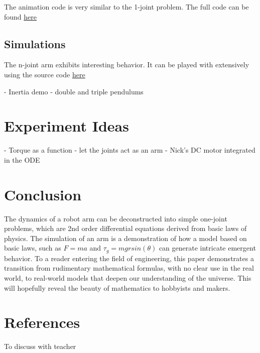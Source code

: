 \documentclass{article}
\begin{document}
\vspace{24pt}

The animation code is very similar to the 1-joint problem. The full code can be found \textcolor{blue}{\href{https://github.com/natebechard/Robotic-Arm-Simulation-From-First-Principles/blob/main/n_joints_constant_torque.py}{here}}

\subsection{Simulations}
The n-joint arm exhibits interesting behavior. It can be played with extensively using the source code \textcolor{blue}{\href{https://github.com/natebechard/Robotic-Arm-Simulation-From-First-Principles/blob/main/n_joints_constant_torque.py}{here}}

- Inertia demo
- double and triple pendulums

\section{Experiment Ideas}
- Torque as a function
- let the joints act as an arm
- Nick's DC motor integrated in the ODE

\section{Conclusion}
\noindent \justifying The dynamics of a robot arm can be deconstructed into simple one-joint problems, which are 2nd order differential equations derived from basic laws of physics. The simulation of an arm is a demonstration of how a model based on basic laws, such as $F = ma$ and $\tau_g = mgrsin(\theta)$ can generate intricate emergent behavior. To a reader entering the field of engineering, this paper demonstrates a transition from rudimentary mathematical formulas, with no clear use in the real world, to real-world models that deepen our understanding of the universe. This will hopefully reveal the beauty of mathematics to hobbyists and makers. 

\centering \section{References}
\centering To discuss with teacher
\end{document}

